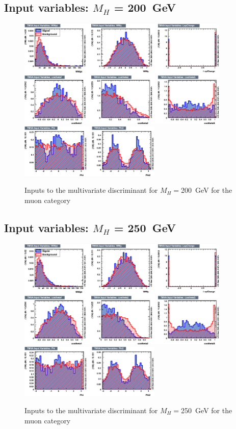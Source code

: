 \subsection{Input variables: \texorpdfstring{$M_H$}{M(H)} = 200~GeV}
\begin{figure}[ht]
  \centering
  \includegraphics[width=0.9\textwidth]{plots/2012_MVA/TMVA_200_nJ2_mu_variables_id_c1.png}
  \includegraphics[width=0.6\textwidth]{plots/2012_MVA/TMVA_200_nJ2_mu_variables_id_c2.png}	
  \caption{\label{fig:inputs200mu}Inputs to the multivariate discriminant for $M_H = $200~GeV for the muon category}
\end{figure}
\newpage
\subsection{Input variables: \texorpdfstring{$M_H$}{M(H)} = 250~GeV}
\begin{figure}[ht]
  \centering
  \includegraphics[width=0.9\textwidth]{plots/2012_MVA/TMVA_250_nJ2_mu_variables_id_c1.png}
  \includegraphics[width=0.6\textwidth]{plots/2012_MVA/TMVA_250_nJ2_mu_variables_id_c2.png}	
  \caption{\label{fig:inputs250mu}Inputs to the multivariate discriminant for $M_H = $250~GeV for the muon category}
\end{figure}
\newpage

